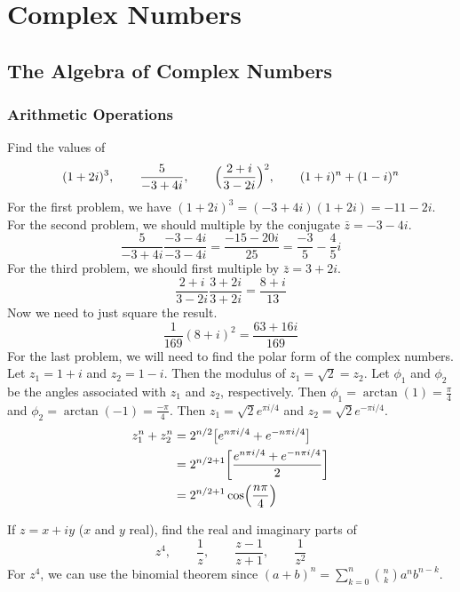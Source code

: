 \chapter{Complex Numbers}

\section{The Algebra of Complex Numbers}

\subsection{Arithmetic Operations}

\begin{exercise}
\item
  Find the values of
  \[
  (1 + 2i)^3, \qquad \frac{5}{-3 + 4i}, \qquad
  \Bigl(\frac{2 + i}{3 - 2i}\Bigr)^2, \qquad (1 + i)^n + (1 - i)^n
  \]
  For the first problem, we have \((1 + 2i)^3 = (-3 + 4i)(1 + 2i) = -11 - 2i\).
  For the second problem, we should multiple by the conjugate
  \(\bar{z} = -3 - 4i\).
  \[
  \frac{5}{-3 + 4i}\frac{-3 - 4i}{-3 - 4i} = \frac{-15 - 20i}{25} =
  \frac{-3}{5} - \frac{4}{5}i
  \]
  For the third problem, we should first multiple by \(\bar{z} = 3 + 2i\).
  \[
  \frac{2 + i}{3 - 2i}\frac{3 + 2i}{3 + 2i} = \frac{8 + i}{13}
  \]
  Now we need to just square the result.
  \[
  \frac{1}{169}(8 + i)^2 = \frac{63 + 16i}{169}
  \]
  For the last problem, we will need to find the polar form of the complex
  numbers.
  Let \(z_1 = 1 + i\) and \(z_2 = 1 - i\).
  Then the modulus of \(z_1 = \sqrt{2} = z_2\).
  Let \(\phi_1\) and \(\phi_2\) be the angles associated with \(z_1\) and
  \(z_2\), respectively.
  Then \(\phi_1 = \arctan(1) = \frac{\pi}{4}\) and
  \(\phi_2 = \arctan(-1) = \frac{-\pi}{4}\).
  Then \(z_1 = \sqrt{2}e^{\pi i/4}\) and \(z_2 = \sqrt{2}e^{-\pi i/4}\).
  \begin{align*}
    z_1^n + z_2^n
    & = 2^{n/2}\bigl[e^{n\pi i/4} + e^{-n\pi i/4}\bigr]\\
    & = 2^{n/2 + 1}\biggl[\frac{e^{n\pi i/4} + e^{-n\pi i/4}}{2}\biggr]\\
    & = 2^{n/2 + 1}\cos\Bigl(\frac{n\pi}{4}\Bigr)
  \end{align*}
\item
  If \(z = x + iy\) (\(x\) and \(y\) real), find the real and imaginary parts
  of
  \[
  z^4, \qquad \frac{1}{z}, \qquad \frac{z - 1}{z + 1}, \qquad \frac{1}{z^2}
  \]
  For \(z^4\), we can use the binomial theorem since
  \((a + b)^n = \sum_{k = 0}^n\binom{n}{k}a^nb^{n - k}\).

\end{exercise}
